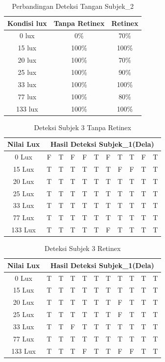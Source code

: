 \begin{table}[H]
	\caption{Perbandingan Deteksi Tangan Subjek\_2 }
	\vspace{0cm}
	\centering
	\begin{tabular}{|c|c|c|}
		\hline Kondisi lux &  Tanpa Retinex &Retinex \\
		\hline  0 lux& 0\% & 70\% \\
		\hline 15 lux & 100\% &100\% \\
		\hline 20 lux & 100\% &70\% \\
		\hline 25 lux & 100\% &90\% \\
		\hline 33 lux & 100\% &100\% \\
		\hline 77 lux & 100\% &80\% \\
		\hline 133 lux & 100\% &100\%\\
		\hline
	\end{tabular}
\end{table}
\begin{table}[H]
	\centering
	\caption{Deteksi Subjek 3 Tanpa Retinex}
	\begin{tabular}{|c|c|c|c|c|c|c|c|c|c|c|}
		\hline Nilai Lux
		& \multicolumn{10}{|c|}{Hasil Deteksi Subjek\_1(Dela)} \\
		\hline 0 Lux &F &T &F &F &T &F &T &T &F &T\\
		\hline 15 Lux &T &T &T &T &T &T &F &F &T &T\\
		\hline 20 Lux &T &T &T &T &T &T &T &T &T &T\\
		\hline 25 Lux &T &T &T &T &T &T &T &T &T &T\\
		\hline 33 Lux &T &T &T &T &T &T &T &T &T &T\\
		\hline 77 Lux &T &T &T &T &T &T &T &T &T &T\\
		\hline 133 Lux &T &T &T &T &T &F &T &T &T &T\\
		\hline
	\end{tabular}
\end{table}
\begin{table}[H]
	\centering
	\caption{Deteksi Subjek 3 Retinex}
	\begin{tabular}{|c|c|c|c|c|c|c|c|c|c|c|}
		\hline Nilai Lux
		& \multicolumn{10}{|c|}{Hasil Deteksi Subjek\_1(Dela)} \\
		\hline 0 Lux &T &T &T &T &T &T &T &T &T &T\\
		\hline 15 Lux &T &T &T &T &T &T &T &T &T &T\\
		\hline 20 Lux  &T &T &T &T &T &T &F &T &T &T\\
		\hline 25 Lux &T &T &T &T &T &T &F &T &T &T\\
		\hline 33 Lux &T &T &F &T &T &T &T &T &T &T\\
		\hline 77 Lux &T &T &T &T &T &T &T &T &T &T\\
		\hline 133 Lux &T &T &T &F &T &T &F &F &T &T\\
		\hline
	\end{tabular}
\end{table}
